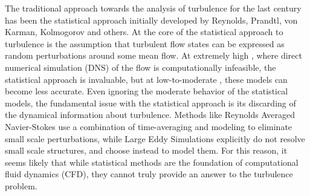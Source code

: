 The traditional approach towards the analysis of turbulence for the last century has been the statistical approach initially developed by Reynolds, Prandtl, von Karman, Kolmogorov and others. At the core of the statistical approach to turbulence is the assumption that turbulent flow states can be expressed as random perturbations around some mean flow. At extremely high \ReN, where direct numerical simulation (DNS) of the flow is computationally infeasible, the statistical approach is invaluable, but at low-to-moderate \ReN, these models can become less accurate. Even ignoring the moderate \ReN behavior of the statistical models, the fundamental issue with the statistical approach is its discarding of the dynamical information about turbulence. Methods like Reynolds Averaged Navier-Stokes use a combination of time-averaging and modeling to eliminate small scale perturbations, while Large Eddy Simulations explicitly do not resolve small scale structures, and choose instead to model them. For this reason, it seems likely that while statistical methods are the foundation of computational fluid dynamics (CFD), they cannot truly provide an answer to the turbulence problem. \\

